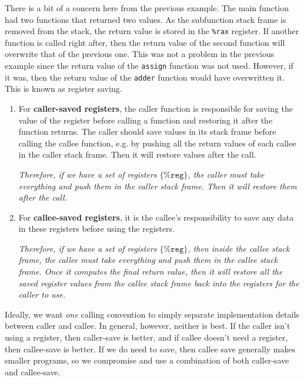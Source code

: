   There is a bit of a concern here from the previous example. The main function had two functions that returned two values. As the subfunction stack frame is removed from the stack, the return value is stored in the \texttt{\%rax} register. If another function is called right after, then the return value of the second function will overwrite that of the previous one. This was not a problem in the previous example since the return value of the \texttt{assign} function was not used. However, if it was, then the return value of the \texttt{adder} function would have overwritten it. This is known as register saving. 
  \begin{enumerate}
    \item For \textbf{caller-saved registers}, the caller function is responsible for saving the value of the register before calling a function and restoring it after the function returns. The caller should save values in its stack frame before calling the callee function, e.g. by pushing all the return values of each callee in the caller stack frame. Then it will restore values after the call. 

    \begin{center}
      \textit{Therefore, if we have a set of registers $\{\texttt{\%reg}\}$, the caller must take everything and push them in the caller stack frame. Then it will restore them after the call.}
    \end{center}

    \item For \textbf{callee-saved registers}, it is the callee's responsibility to save any data in these registers before using the registers. 

      \begin{center} 
        \textit{Therefore, if we have a set of registers $\{\texttt{\%reg}\}$, then inside the callee stack frame, the callee must take everything and push them in the callee stack frame. Once it computes the final return value, then it will restore all the saved register values from the callee stack frame back into the registers for the caller to use.}
      \end{center}
  \end{enumerate}

  Ideally, we want \textit{one} calling convention to simply separate implementation details between caller and callee. In general, however, neither is best. If the caller isn't using a register, then caller-save is better, and if callee doesn't need a register, then callee-save is better. If we do need to save, then callee save generally makes smaller programs, so we compromise and use a combination of both caller-save and callee-save. 

